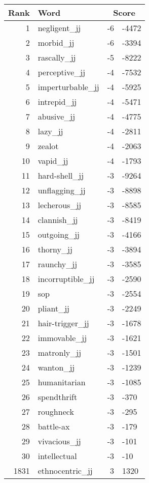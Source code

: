 \begin{longtable}[!htbp]{| rlr@{.}l |}
    \hline
    \textbf{Rank} & \textbf{Word} & \multicolumn{2}{c|}{\textbf{Score}} \\
    \hline
    \endhead
    1 & negligent\_jj & -6 & -4472 \\
    2 & morbid\_jj & -6 & -3394 \\
    3 & rascally\_jj & -5 & -8222 \\
    4 & perceptive\_jj & -4 & -7532 \\
    5 & imperturbable\_jj & -4 & -5925 \\
    6 & intrepid\_jj & -4 & -5471 \\
    7 & abusive\_jj & -4 & -4775 \\
    8 & lazy\_jj & -4 & -2811 \\
    9 & zealot & -4 & -2063 \\
    10 & vapid\_jj & -4 & -1793 \\
    11 & hard-shell\_jj & -3 & -9264 \\
    12 & unflagging\_jj & -3 & -8898 \\
    13 & lecherous\_jj & -3 & -8585 \\
    14 & clannish\_jj & -3 & -8419 \\
    15 & outgoing\_jj & -3 & -4166 \\
    16 & thorny\_jj & -3 & -3894 \\
    17 & raunchy\_jj & -3 & -3585 \\
    18 & incorruptible\_jj & -3 & -2590 \\
    19 & sop & -3 & -2554 \\
    20 & pliant\_jj & -3 & -2249 \\
    21 & hair-trigger\_jj & -3 & -1678 \\
    22 & immovable\_jj & -3 & -1621 \\
    23 & matronly\_jj & -3 & -1501 \\
    24 & wanton\_jj & -3 & -1239 \\
    25 & humanitarian & -3 & -1085 \\
    26 & spendthrift & -3 & -370 \\
    27 & roughneck & -3 & -295 \\
    28 & battle-ax & -3 & -179 \\
    29 & vivacious\_jj & -3 & -101 \\
    30 & intellectual & -3 & -10 \\
    1831 & ethnocentric\_jj & 3 & 1320 \\

\end{longtable}
